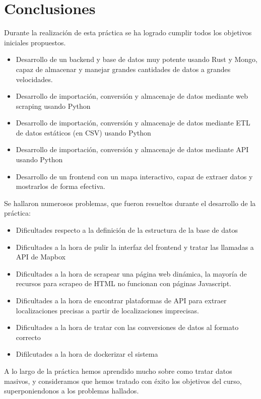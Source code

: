 \section{Conclusiones}

Durante la realización de esta práctica se ha logrado cumplir todos los objetivos iniciales propuestos.

\begin{itemize}
    \item Desarrollo de un backend y base de datos muy potente usando Rust y Mongo, capaz de almacenar y manejar grandes cantidades de datos a grandes velocidades.
    \item Desarrollo de importación, conversión y almacenaje de datos mediante web scraping usando Python
    \item Desarrollo de importación, conversión y almacenaje de datos mediante ETL de datos estáticos (en CSV) usando Python
    \item Desarrollo de importación, conversión y almacenaje de datos mediante API usando Python
    \item Desarrollo de un frontend con un mapa interactivo, capaz de extraer datos y mostrarlos de forma efectiva.
\end{itemize}

Se hallaron numerosos problemas, que fueron resueltos durante el desarrollo de la práctica:
\begin{itemize}
    \item Dificultades respecto a la definición de la estructura de la base de datos 
    \item Dificultades a la hora de pulir la interfaz del frontend y tratar las llamadas a API de Mapbox
    \item Dificultades a la hora de scrapear una página web dinámica, la mayoría de recursos para scrapeo de HTML no funcionan con páginas Javascript.
    \item Dificultades a la hora de encontrar plataformas de API para extraer localizaciones precisas a partir de localizaciones imprecisas.
    \item Dificultades a la hora de tratar con las conversiones de datos al formato correcto
    \item Difilcutades a la hora de dockerizar el sistema
\end{itemize} 

A lo largo de la práctica hemos aprendido mucho sobre como tratar datos masivos, y consideramos que hemos tratado con éxito los objetivos del curso, superponiendonos a los problemas hallados.